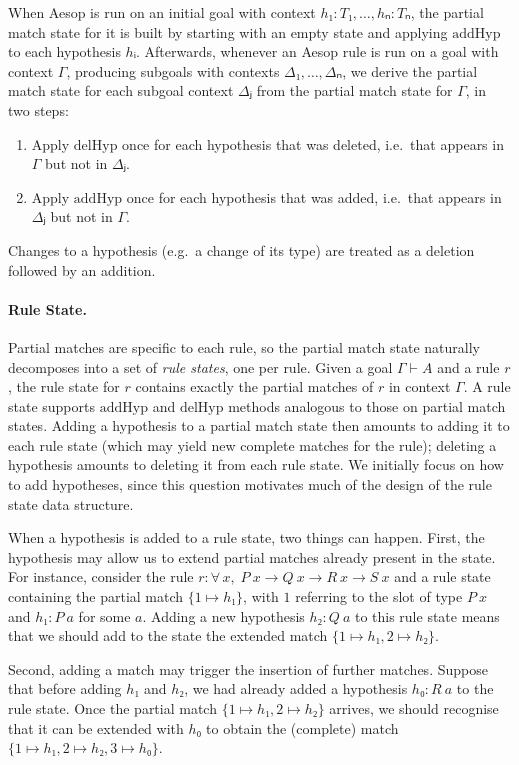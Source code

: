 \documentclass[runningheads]{llncs}
\newcommand{\All}[2]{\ensuremath{\forall\, #1,\; #2}}
\newcommand{\addHyp}{\ensuremath{\mathrm{addHyp}}}
\newcommand{\delHyp}{\ensuremath{\mathrm{delHyp}}}
\begin{document}
When Aesop is run on an initial goal with context $h₁ : T₁, \dots, hₙ : Tₙ$, the partial match state for it is built by starting with an empty state and applying $\addHyp$ to each hypothesis $hᵢ$.
Afterwards, whenever an Aesop rule is run on a goal with context $Γ$, producing subgoals with contexts $Δ₁, \dots, Δₙ$, we derive the partial match state for each subgoal context $Δⱼ$ from the partial match state for $Γ$, in two steps:
\begin{enumerate}
  \item Apply $\delHyp$ once for each hypothesis that was deleted, i.e.\ that appears in $Γ$ but not in $Δⱼ$.
  \item Apply $\addHyp$ once for each hypothesis that was added, i.e.\ that appears in $Δⱼ$ but not in $Γ$.
\end{enumerate}
Changes to a hypothesis (e.g.\ a change of its type) are treated as a deletion followed by an addition.

\paragraph{Rule State.}
Partial matches are specific to each rule, so the partial match state naturally decomposes into a set of \emph{rule states}, one per rule.
Given a goal $Γ ⊢ A$ and a rule $r$, the rule state for $r$ contains exactly the partial matches of $r$ in context $Γ$.
A rule state supports $\addHyp$ and $\delHyp$ methods analogous to those on partial match states.
Adding a hypothesis to a partial match state then amounts to adding it to each rule state (which may yield new complete matches for the rule); deleting a hypothesis amounts to deleting it from each rule state.
We initially focus on how to add hypotheses, since this question motivates much of the design of the rule state data structure.

When a hypothesis is added to a rule state, two things can happen.
First, the hypothesis may allow us to extend partial matches already present in the state.
For instance, consider the rule $r : \All{x}{P~x → Q~x → R~x → S~x}$ and a rule state containing the partial match $\{1 ↦ h₁\}$, with $1$ referring to the slot of type $P~x$ and $h₁ : P~a$ for some $a$.
Adding a new hypothesis $h₂ : Q~a$ to this rule state means that we should add to the state the extended match $\{1 ↦ h₁, 2 ↦ h₂\}$.

Second, adding a match may trigger the insertion of further matches.
Suppose that before adding $h₁$ and $h₂$, we had already added a hypothesis $h₀ : R~a$ to the rule state.
Once the partial match $\{1 ↦ h₁, 2 ↦ h₂\}$ arrives, we should recognise that it can be extended with $h₀$ to obtain the (complete) match $\{1 ↦ h₁, 2 ↦ h₂, 3 ↦ h₀\}$.
\end{document}
